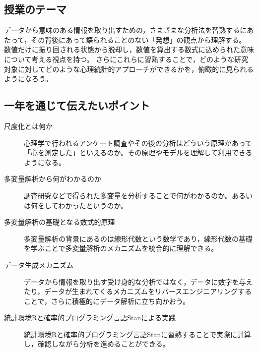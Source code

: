 \documentclass[dvipsnames]{ltjsarticle}
\begin{document}
\subsection*{授業のテーマ}
データから意味のある情報を取り出すための，さまざまな分析法を習熟するにあたって，その背後にあって語られることのない「発想」の観点から理解する。
数値だけに振り回される状態から脱却し，数値を算出する数式に込められた意味について考える視点を持つ。
さらにこれらに習熟することで，どのような研究対象に対してどのような心理統計的アプローチができるかを，俯瞰的に見られるようになろう。

\subsection*{一年を通じて伝えたいポイント}
\begin{description}
	\item[尺度化とは何か] 心理学で行われるアンケート調査やその後の分析はどういう原理があって「心を測定した」といえるのか。その原理やモデルを理解して利用できるようになる。
	\item[多変量解析から何がわかるのか] 調査研究などで得られた多変量を分析することで何がわかるのか。あるいは何をしてわかったというのか。
	\item[多変量解析の基礎となる数式的原理] 多変量解析の背景にあるのは線形代数という数学であり，線形代数の基礎を学ぶことで多変量解析のメカニズムを統合的に理解できる。
	\item[データ生成メカニズム] データから情報を取り出す受け身的な分析ではなく，データに数字を与えたり，データが生まれてくるメカニズムをリバースエンジニアリングすることで，さらに積極的にデータ解析に立ち向かおう。
	\item[統計環境Rと確率的プログラミング言語Stanによる実践] 統計環境Rと確率的プログラミング言語Stanに習熟することで実際に計算し，確認しながら分析を進めることができる。
\end{description}
\end{document}
